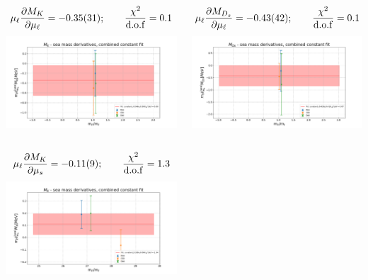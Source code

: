 \documentclass[xcolor={dvipsnames,table}]{beamer}
\begin{document}
\begin{frame}

  \begin{columns}
    \begin{column}{0.5\textwidth}
      {\small $$\mu_\ell \frac{\partial M_{K}}{\partial \mu_\ell} = -0.35(31); \qquad\frac{\chi^2}{\rm d.o.f}= 0.1$$}
      \includegraphics[trim=0cm 0.5cm 0cm 1.3cm, clip,width=\textwidth]{plots/const_fit_MK_der_ml.png}
      \vspace*{-0.8cm} \,\\
      {\small $$\mu_\ell \frac{\partial M_{K}}{\partial \mu_s} = -0.11(9); \qquad\frac{\chi^2}{\rm d.o.f}= 1.3$$}
      \includegraphics[trim=0cm 0.5cm 0cm 1.3cm, clip,width=\textwidth]{plots/const_fit_MK_der_ms.png}
    \end{column}
    \begin{column}{0.5\textwidth}
      {\small $$\mu_\ell \frac{\partial M_{D_s}}{\partial \mu_\ell} = -0.43(42); \qquad\frac{\chi^2}{\rm d.o.f}= 0.1$$}
      \includegraphics[trim=0cm 0.5cm 0cm 1.3cm, clip,width=\textwidth]{plots/const_fit_MD_der_ml.png}

\end{column}
\end{columns}
\end{frame}
\end{document}
